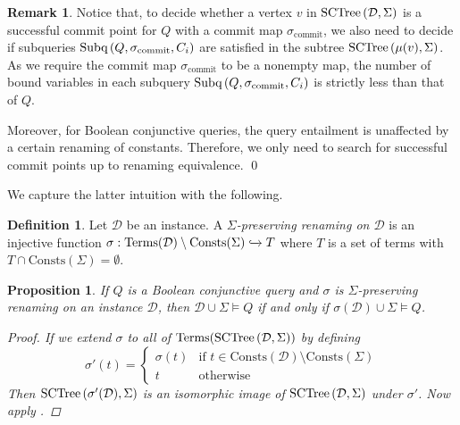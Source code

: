 \documentclass[12pt]{report}
\theoremstyle{plain}
\newtheorem{proposition}[theorem]{Proposition}
\theoremstyle{definition}
\newtheorem{definition}[theorem]{Definition}
\newtheorem{remark}[theorem]{Remark}
\def\Consts{{\mathrm{Consts}}}
\def\Terms{{\mathrm{Terms}}}
\newcommand{\SCTree}[2]{\ensuremath{\normalfont{\textrm{SCTree}} \left( #1, #2 \right)}}
\newcommand{\Subq}[3]{\ensuremath{\normalfont{\textrm{Subq}} \left( #1, #2, #3 \right)}}
\begin{document}
\begin{remark}
\label{remark-towards-query-answering-procedure}
  Notice that, to decide whether a vertex $v$ in $\SCTree{\mathcal{D}}{\Sigma}$ is a successful commit point for $Q$ with a commit map $\sigma_\mathrm{commit}$, we also need to decide if subqueries $\Subq{Q}{\sigma_\mathrm{commit}}{C_i}$ are satisfied in the subtree $\SCTree{\mu(v)}{\Sigma}$. As we require the commit map $\sigma_\mathrm{commit}$ to be a nonempty map, the number of bound variables in each subquery $\Subq{Q}{\sigma_\mathrm{commit}}{C_i}$ is strictly less than that of $Q$.

  Moreover, for Boolean conjunctive queries, the query entailment is unaffected by a certain renaming of constants. Therefore, we only need to search for successful commit points up to renaming equivalence.
  \qed
\end{remark}

We capture the latter intuition with the following.

\begin{definition}
  Let $\mathcal{D}$ be an instance. A \emph{$\Sigma$-preserving renaming on $\mathcal{D}$} is an injective function $\sigma: \Terms(\mathcal{D}) \setminus \Consts(\Sigma) \xhookrightarrow{} T$ where $T$ is a set of terms with $T \cap \Consts(\Sigma) = \emptyset$.
\end{definition}

\begin{proposition}
\label{bcq-invariant-under-sigma-preserving-renaming}
  If $Q$ is a Boolean conjunctive query and $\sigma$ is $\Sigma$-preserving renaming on an instance $\mathcal{D}$, then $\mathcal{D} \cup \Sigma \models Q$ if and only if $\sigma(\mathcal{D}) \cup \Sigma \models Q$.
  \begin{proof}
    If we extend $\sigma$ to all of $\Terms(\SCTree{\mathcal{D}}{\Sigma})$ by defining $$\sigma'(t) =
    \begin{cases}
      \sigma(t) & \text{if } t \in \Consts(\mathcal{D}) \setminus \Consts(\Sigma) \\
      t & \text{otherwise}
    \end{cases}$$
    Then $\SCTree{\sigma'(\mathcal{D})}{\Sigma}$ is an isomorphic image of $\SCTree{\mathcal{D}}{\Sigma}$ under $\sigma'$. Now apply .
  \end{proof}
\end{proposition}
\end{document}
